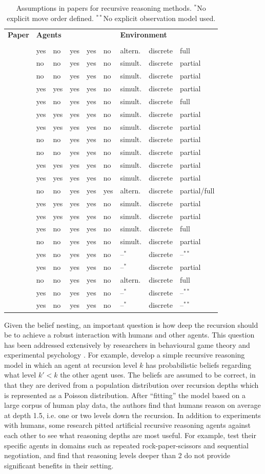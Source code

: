 \documentclass[final,1p,times,authoryear]{elsarticle}
\makeatletter
\newcommand{\nil}{@{}}
\newcommand{\nl}{\newline}
\newcommand{\rbox}[2]{\rotatebox{45}{\parbox{#1\textwidth}{#2}}}
\newcommand{\btab}{
	\center
	\scriptsize
	\bgroup\def\arraystretch{1.2}
	\begin{tabular}{\nil p{0.32\textwidth} @{\hspace{11pt}} l \nil l \nil l \nil l \nil l \nil l \nil l \nil l \nil}
		\toprule
		\bf Paper	& \multicolumn{5}{l}{\hspace{-5pt}\bf Agents} & \multicolumn{3}{l}{\hspace{-5pt}\bf Environment} \\[-5pt]
				& \rbox{0.075}{Stochastic \nl actions?} & \rbox{0.075}{Changing \nl behaviour?} & \rbox{0.075}{Factors \nl known?} & \rbox{0.07}{Independent \nl agents?} & \rbox{0.06}{Common \nl goals?} & \rbox{0.10}{Move order} & \rbox{0.11}{State/action \nl representation} & \rbox{0.09}{State/action \nl observability} \\
		\midrule}
\newcommand{\tabrow}[9]{\citep{#1} & #2 & #3 & #4 & #5 & #6 & #7 & #8 & #9 \\}
\newcommand{\etab}{
		\bottomrule
	\end{tabular}
	\egroup}
\newcommand{\si}{simult.}
\newcommand{\al}{altern.}
\newcommand{\as}{$^{*}$}
\newcommand{\ass}{$^{**}$}
\makeatother
\begin{document}
\begin{table}[t]
	\btab
		\tabrow{dvb2017}{yes}{no}{yes}{yes}{no}{\al}{discrete}{full}
		\tabrow{kg2015}{no}{no}{yes}{yes}{no}{\si}{discrete}{partial}
		\tabrow{mbfm2015}{no}{no}{yes}{yes}{no}{\si}{discrete}{partial}
		\tabrow{sd2015}{yes}{yes}{yes}{yes}{no}{\si}{discrete}{partial}
		\tabrow{dvv2013}{yes}{no}{yes}{yes}{no}{\si}{discrete}{full}
		\tabrow{hl2013}{yes}{yes}{yes}{yes}{no}{\si}{discrete}{partial}
		\tabrow{nbmw2012}{yes}{yes}{yes}{yes}{no}{\si}{discrete}{partial}
		\tabrow{ba2011}{no}{no}{yes}{yes}{no}{\si}{discrete}{partial}
		\tabrow{lpw2010}{no}{no}{yes}{yes}{no}{\si}{discrete}{partial}
		\tabrow{dg2009}{yes}{yes}{yes}{yes}{no}{\si}{discrete}{partial}
		\tabrow{dp2008}{yes}{yes}{yes}{yes}{no}{\si}{discrete}{partial}
		\tabrow{gll2007}{no}{no}{yes}{yes}{yes}{\al}{discrete}{partial/full}
		\tabrow{rdg2006}{yes}{yes}{yes}{yes}{no}{\si}{discrete}{partial}
		\tabrow{gd2005}{yes}{yes}{yes}{yes}{no}{\si}{discrete}{partial}
		\tabrow{ctj2004}{yes}{no}{yes}{yes}{no}{\si}{discrete}{full}
		\tabrow{vdh2002}{no}{no}{yes}{yes}{no}{\si}{discrete}{partial}
		\tabrow{gd2000,gd1995}{yes}{no}{yes}{yes}{no}{--\as}{discrete}{--\ass}
		\tabrow{gnk1998}{yes}{no}{yes}{yes}{no}{--\as}{discrete}{partial}
		\tabrow{cm1996search}{no}{no}{yes}{yes}{no}{\al}{discrete}{full}
		\tabrow{vd1995}{yes}{no}{yes}{yes}{no}{--\as}{discrete}{--\ass}
		\tabrow{gdw1991}{yes}{no}{yes}{yes}{no}{--\as}{discrete}{--\ass}
	\etab
	\caption{Assumptions in papers for recursive reasoning methods. \as No explicit move order defined. \ass No explicit observation model used.}
	\label{tab:recreas}
\end{table}

Given the belief nesting, an important question is how deep the recursion should be to achieve a robust interaction with humans and other agents. This question has been addressed extensively by researchers in behavioural game theory and experimental psychology \citep{chc2015,gdy2012,wl2010,ydf2008,ctj2004,hz2002}. For example, \citet{ctj2004} develop a simple recursive reasoning model in which an agent at recursion level $k$ has probabilistic beliefs regarding what level $k' < k$ the other agent uses. The beliefs are assumed to be correct, in that they are derived from a population distribution over recursion depths which is represented as a Poisson distribution. After ``fitting'' the model based on a large corpus of human play data, the authors find that humans reason on average at depth 1.5, i.e. one or two levels down the recursion. In addition to experiments with humans, some research pitted artificial recursive reasoning agents against each other to see what reasoning depths are most useful. For example, \citet{dvb2017,dvv2013} test their specific agents in domains such as repeated rock-paper-scissors and sequential negotiation, and find that reasoning levels deeper than 2 do not provide significant benefits in their setting.
\end{document}
